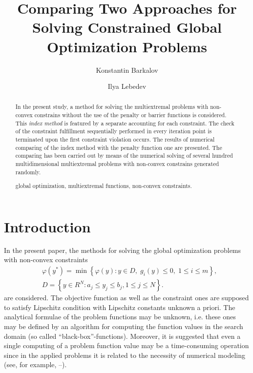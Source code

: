 \documentclass{llncs}
\begin{document}
\mainmatter 

\title{Comparing Two Approaches for Solving Constrained Global Optimization Problems}
\author{Konstantin Barkalov \Letter \and Ilya Lebedev \\
}




\maketitle

\begin{abstract}
In the present study, a method for solving the multiextremal problems with non-convex constrains without the use of the penalty or barrier functions is considered. This \textit{index method} is featured by a separate accounting for each constraint. The check of the constraint fulfillment sequentially performed in every iteration point is terminated upon the first constraint violation occurs. The results of numerical comparing of the index method with the penalty function one are presented. The comparing has been carried out by means of the numerical solving of several hundred multidimensional multiextremal problems with non-convex constrains generated randomly.

\keywords global optimization, multiextremal functions, non-convex constraints.

\end{abstract}

\section{Introduction}

In the present paper, the methods for solving the global optimization problems with non-convex constraints
\begin{eqnarray}
&\varphi(y^\ast)=\min{\left\{\varphi(y):y\in D, \; g_i(y)\leq 0, \; 1 \leq i \leq m\right\}}, \label{problem} \\
&D=\left\{y\in R^N: a_j\leq y_j \leq b_j, 1\leq j \leq N\right\}. \label{D}
\end{eqnarray}
are considered. The objective function as well as the constraint ones are supposed to satisfy Lipschitz condition
with Lipschitz constants unknown a priori. The analytical formulae of the problem functions may be unknown, i.e. these ones may be defined by an algorithm for computing the function values in the search domain (so called ``black-box''-functions). Moreover, it is suggested that even a single computing of a problem function value may be a time-consuming operation since in the applied problems it is related to the necessity of numerical modeling (see, for example, \cite{Famularo}--\cite{Modorskii}).
\end{document}

